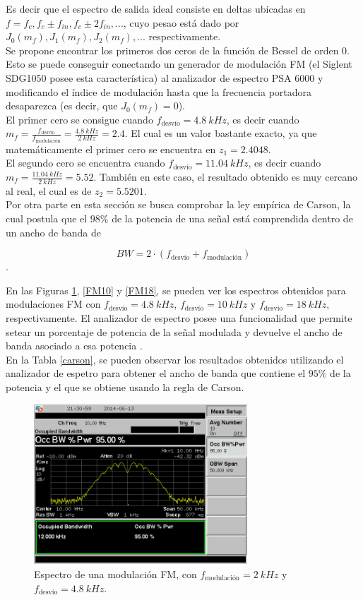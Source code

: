 \documentclass[a4paper,10pt]{article}
\begin{document}
		\indent Es decir que el espectro de salida ideal consiste en deltas 
		ubicadas en $f=f_c,f_c\pm f_{in},f_c\pm 2f_{in},...$, cuyo pesao 
		est\'a dado por $J_0(m_f),J_1(m_f),J_2(m_f),...$ respectivamente. \\
		\indent Se propone encontrar los primeros dos ceros de la funci\'on de 
		Bessel de orden 0. Esto se puede conseguir conectando un generador de 
		modulaci\'on FM (el Siglent SDG1050 posee esta caracter\'istica) al 
		analizador de espectro PSA 6000 y modificando el \'indice de 
		modulaci\'on hasta que la frecuencia portadora desaparezca (es decir, 
		que $J_0(m_f)=0$). \\
		\indent El primer cero se consigue cuando $f_{\mbox{desv\'io}}=4.8~kHz$,
		es decir cuando $m_f=\frac{f_{\mbox{desv\'io}}}{f_{\mbox{modulaci\'on}}}
		=\frac{4.8~kHz}{2~kHz}=2.4$. El cual es un valor bastante exacto, ya que
		matem\'aticamente el primer cero se encuentra en $z_1=2.4048$. \\
		\indent El segundo cero se encuentra cuando $f_{\mbox{desv\'io}}=11.04~
		kHz$, es decir cuando $m_f=\frac{11.04~kHz}{2~kHz}=5.52$. Tambi\'en en 
		este caso, el resultado obtenido es muy cercano al real, el cual es de 
		$z_2=5.5201$. \\
		\indent Por otra parte en esta secci\'on se busca comprobar la ley 
		emp\'irica de Carson, la cual postula que el $98\%$ de la potencia de 
		una se\~nal est\'a comprendida dentro de un ancho de banda de

		$$BW=2\cdot(f_{\mbox{desv\'io}}+f_{\mbox{modulaci\'on}})$$.
		
		\indent En las Figuras \ref{FM48}, \ref{FM10} y \ref{FM18}, se pueden 
		ver los espectros obtenidos para modulaciones FM con 
		$f_{\mbox{desv\'io}}=4.8~kHz$, $f_{\mbox{desv\'io}}=10~kHz$ y 
		$f_{\mbox{desv\'io}}=18~kHz$, respectivamente. El analizador de espectro
		posee una funcionalidad que permite setear un porcentaje de potencia de 
		la se\~nal modulada y devuelve el ancho de banda asociado a esa potencia
		. \\
		\indent En la Tabla \ref{carson}, se pueden observar los resultados 
		obtenidos utilizando el analizador de espetro para obtener el ancho de 
		banda que contiene el $95\%$ de la potencia y el que se obtiene usando 
		la regla de Carson.	
		
		\begin{figure}[!htb]
			\centering
			\includegraphics[width=8cm]
			{Imagenes/SCREN460.png}
			\caption{Espectro de una modulaci\'on FM, con $
			f_{\mbox{modulaci\'on}}=2~kHz$ y $f_{\mbox{desv\'io}}=4.8~kHz$.}
			\label{FM48} 
		\end{figure}		
		
\end{document}
